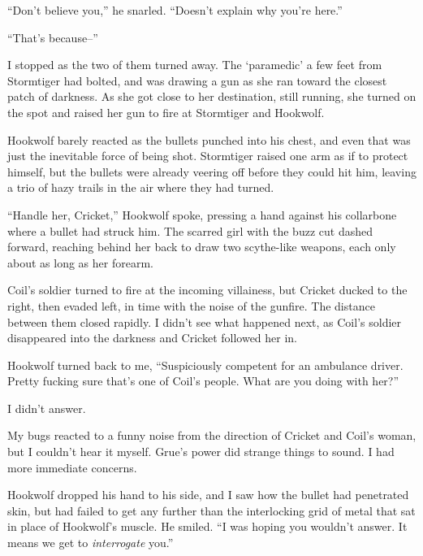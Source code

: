 ``Don't believe you,'' he snarled.  ``Doesn't explain why you're here.''



``That's because--''



I stopped as the two of them turned away.  The `paramedic' a few feet from Stormtiger had bolted, and was drawing a gun as she ran toward the closest patch of darkness.  As she got close to her destination, still running, she turned on the spot and raised her gun to fire at Stormtiger and Hookwolf.



Hookwolf barely reacted as the bullets punched into his chest, and even that was just the inevitable force of being shot.  Stormtiger raised one arm as if to protect himself, but the bullets were already veering off before they could hit him, leaving a trio of hazy trails in the air where they had turned.



``Handle her, Cricket,'' Hookwolf spoke, pressing a hand against his collarbone where a bullet had struck him.  The scarred girl with the buzz cut dashed forward, reaching behind her back to draw two scythe-like weapons, each only about as long as her forearm.



Coil's soldier turned to fire at the incoming villainess, but Cricket ducked to the right, then evaded left, in time with the noise of the gunfire.  The distance between them closed rapidly.  I didn't see what happened next, as Coil's soldier disappeared into the darkness and Cricket followed her in.



Hookwolf turned back to me, ``Suspiciously competent for an ambulance driver.  Pretty fucking sure that's one of Coil's people.  What are you doing with her?''



I didn't answer.



My bugs reacted to a funny noise from the direction of Cricket and Coil's woman, but I couldn't hear it myself.  Grue's power did strange things to sound.  I had more immediate concerns.



Hookwolf dropped his hand to his side, and I saw how the bullet had penetrated skin, but had failed to get any further than the interlocking grid of metal that sat in place of Hookwolf's muscle.  He smiled.  ``I was hoping you wouldn't answer.  It means we get to \emph{interrogate} you.''



